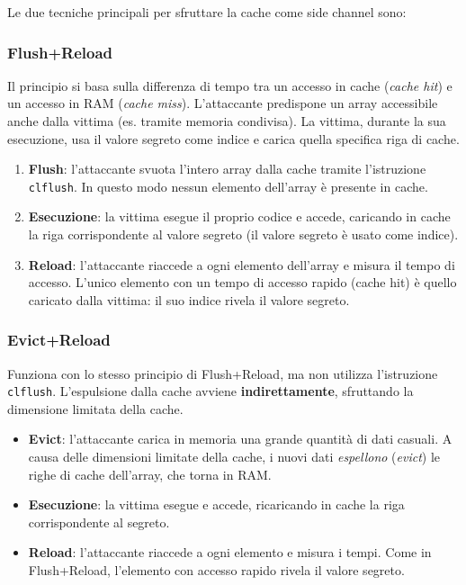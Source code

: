 \documentclass{article}
\begin{document}
Le due tecniche principali per sfruttare la cache come side channel sono:

\subsubsection*{Flush+Reload}

Il principio si basa sulla differenza di tempo tra un accesso in cache 
(\textit{cache hit}) e un accesso in RAM (\textit{cache miss}). L'attaccante predispone un array accessibile anche dalla vittima (es. tramite memoria condivisa). La vittima, durante la sua esecuzione, usa il valore segreto come indice e carica quella specifica riga di cache.

\begin{enumerate}
    \item \textbf{Flush}: l'attaccante svuota l'intero array
    dalla cache tramite l'istruzione \texttt{clflush}. In questo modo nessun elemento dell'array è presente in cache.
    
    \item \textbf{Esecuzione}: la vittima esegue il proprio codice e accede, caricando in cache la riga corrispondente al valore segreto (il valore segreto è usato come indice).
    
    \item \textbf{Reload}: l'attaccante riaccede a ogni elemento dell'array e misura il tempo di accesso. L'unico elemento con un tempo di accesso rapido (cache hit) è quello caricato dalla vittima: il suo indice rivela il valore segreto.
\end{enumerate}

\subsubsection*{Evict+Reload}

Funziona con lo stesso principio di Flush+Reload, ma non utilizza 
l'istruzione \texttt{clflush}. L'espulsione dalla cache avviene 
\textbf{indirettamente}, sfruttando la dimensione limitata della cache.

\begin{itemize}
    \item \textbf{Evict}: l'attaccante carica in memoria una grande quantità di dati casuali. A causa delle dimensioni limitate della cache, i nuovi dati \textit{espellono} (\textit{evict}) le righe di cache dell'array, che torna in RAM.
    
    \item \textbf{Esecuzione}: la vittima esegue e accede, ricaricando in cache la riga corrispondente al segreto.
    
    \item \textbf{Reload}: l'attaccante riaccede a ogni elemento e misura i tempi. Come in Flush+Reload, l'elemento con accesso rapido rivela il valore segreto.
\end{itemize}
\end{document}
